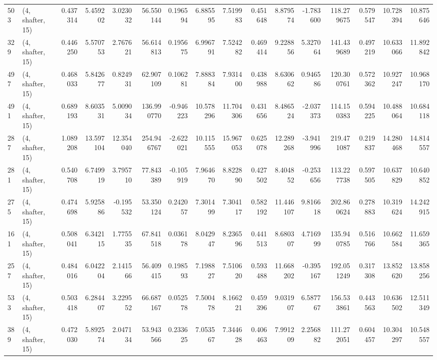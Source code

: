 \begin{tabular}{llrrrrrrrrrrrrrr}
503 &  (4, shafter, 15) &   0.437314 &   5.459202 &   3.023032 &    56.550144 &   0.196594 &   6.885595 &   7.519983 &  0.451648 &   8.879574 &  -1.783600 &    118.279675 &   0.579547 &  10.728394 &   10.875646 \\
329 &  (4, shafter, 15) &   0.446250 &   5.570753 &   2.767621 &    56.614813 &   0.195675 &   6.996791 &   7.524282 &  0.469414 &   9.228856 &   5.327064 &    141.439689 &   0.497219 &  10.633066 &   11.892842 \\
497 &  (4, shafter, 15) &   0.468033 &   5.842677 &   0.824931 &    62.907109 &   0.106281 &   7.888384 &   7.931400 &  0.438988 &   8.630662 &   0.946586 &    120.300761 &   0.572362 &  10.927247 &   10.968170 \\
491 &  (4, shafter, 15) &   0.689193 &   8.603531 &   5.009034 &   136.990770 &  -0.946223 &  10.578296 &  11.704306 &  0.431656 &   8.486524 &  -2.037373 &    114.150383 &   0.594225 &  10.488064 &   10.684118 \\
287 &  (4, shafter, 15) &   1.089208 &  13.597104 &  12.354040 &   254.946767 &  -2.622021 &  10.115555 &  15.967053 &  0.625078 &  12.289268 &  -3.941996 &    219.471087 &   0.219837 &  14.280468 &   14.814557 \\
281 &  (4, shafter, 15) &   0.540708 &   6.749919 &   3.795710 &    77.843389 &  -0.105919 &   7.964670 &   8.822890 &  0.427502 &   8.404852 &  -0.253656 &    113.227738 &   0.597505 &  10.637829 &   10.640852 \\
275 &  (4, shafter, 15) &   0.474698 &   5.925886 &  -0.195532 &    53.350124 &   0.242057 &   7.301499 &   7.304117 &  0.582192 &  11.446107 &   9.816618 &    202.860624 &   0.278883 &  10.319624 &   14.242915 \\
161 &  (4, shafter, 15) &   0.508041 &   6.342115 &   1.775535 &    67.841518 &   0.036178 &   8.042947 &   8.236596 &  0.441513 &   8.680307 &   4.716999 &    135.940785 &   0.516766 &  10.662584 &   11.659365 \\
257 &  (4, shafter, 15) &   0.484016 &   6.042204 &   2.141566 &    56.409415 &   0.198593 &   7.198827 &   7.510620 &  0.593488 &  11.668202 &  -0.395167 &    192.051249 &   0.317308 &  13.852620 &   13.858256 \\
533 &  (4, shafter, 15) &   0.503418 &   6.284407 &   3.229552 &    66.687167 &   0.052578 &   7.500478 &   8.166221 &  0.459396 &   9.031907 &   6.587767 &    156.533861 &   0.443563 &  10.636502 &   12.511349 \\
389 &  (4, shafter, 15) &   0.472030 &   5.892574 &   2.047134 &    53.943566 &   0.233625 &   7.053567 &   7.344628 &  0.406463 &   7.991209 &   2.256882 &    111.272051 &   0.604457 &  10.304297 &   10.548557 \\

\end{tabular}
